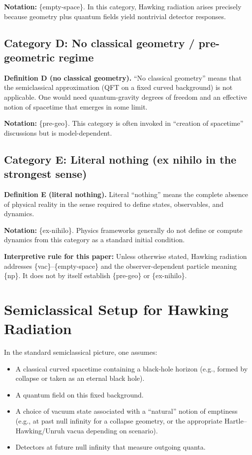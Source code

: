 \documentclass[11pt,a4paper]{article}
\begin{document}
\medskip
\noindent \textbf{Notation:} \{empty-space\}.
In this category, Hawking radiation arises precisely because geometry plus quantum fields yield nontrivial detector responses.

\subsection{Category D: No classical geometry / pre-geometric regime}
\textbf{Definition D (no classical geometry).} ``No classical geometry'' means that the semiclassical approximation (QFT on a fixed curved background) is not applicable. One would need quantum-gravity degrees of freedom and an effective notion of spacetime that emerges in some limit.

\medskip
\noindent \textbf{Notation:} \{pre-geo\}.
This category is often invoked in ``creation of spacetime'' discussions but is model-dependent.

\subsection{Category E: Literal nothing (ex nihilo in the strongest sense)}
\textbf{Definition E (literal nothing).} Literal ``nothing'' means the complete absence of physical reality in the sense required to define states, observables, and dynamics.

\medskip
\noindent \textbf{Notation:} \{ex-nihilo\}.
Physics frameworks generally do not define or compute dynamics from this category as a standard initial condition.

\medskip
\noindent\textbf{Interpretive rule for this paper:}
Unless otherwise stated, Hawking radiation addresses \{vac\}--\{empty-space\} and the observer-dependent particle meaning \{np\}. It does not by itself establish \{pre-geo\} or \{ex-nihilo\}.

\section{Semiclassical Setup for Hawking Radiation}
In the standard semiclassical picture, one assumes:
\begin{itemize}[leftmargin=2em]
\item A classical curved spacetime containing a black-hole horizon (e.g., formed by collapse or taken as an eternal black hole).
\item A quantum field on this fixed background.
\item A choice of vacuum state associated with a ``natural'' notion of emptiness (e.g., at past null infinity for a collapse geometry, or the appropriate Hartle--Hawking/Unruh vacua depending on scenario).
\item Detectors at future null infinity that measure outgoing quanta.
\end{itemize}
\end{document}
